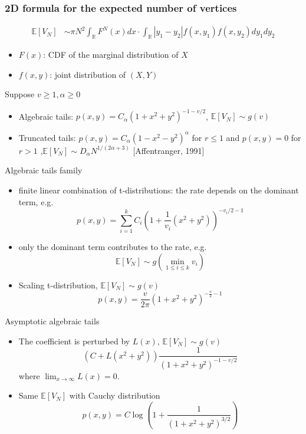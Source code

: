 \documentclass{beamer}
\def\E{\mathbb{E}}
\def\R{\mathbb{R}}
\begin{document}
\begin{frame}
    \frametitle{
        2D formula for the expected number of vertices
    }
    \begin{align*}
        \E[V_N]
        & \sim \pi N^2 \int_{\R} F^{N}(x) dx \cdot \int_{\R} |y_1-y_2| f(x, y_1) f(x,y_2)dy_1dy_2
    \end{align*}
    \begin{itemize}
        \item $F(x)$: CDF of the marginal distribution of $X$
        \item $f(x,y)$: joint distribution of $(X,Y)$
    \end{itemize}
    Suppose  $v\geq 1, \alpha \geq 0$
    \begin{itemize}
        \item Algebraic tails: $p(x,y) = C_{\alpha}(1+x^2+y^2)^{-1-v/2}$,
        $\E[V_N] \sim g(v)$
        \item Truncated tails: $p(x,y) = C_{\alpha}(1-x^2-y^2)^{\alpha}$ for $r\leq 1$ and $p(x,y)=0$ for $r>1$
        ,$\E[V_N] \sim D_{\alpha} N^{1/(2\alpha + 3)}$ [Affentranger, 1991]
    \end{itemize}
\end{frame}
\begin{frame}{Algebraic tails family}
    \begin{itemize}
        \item finite linear combination of t-distributions: the rate depends on the dominant term, e.g.
        \begin{equation*}
            p(x,y) = \sum_{i=1}^k C_i (1+\frac{1}{v_i}(x^2+y^2))^{-v_i/2 - 1}
        \end{equation*}
        \item only the dominant term contributes to the rate, e.g.
        \begin{equation*}
            \E[V_N] \sim g\left(
                \min_{1\leq i\leq k} v_i
                \right)
        \end{equation*}
        \item Scaling t-distribution, $\E[V_N] \sim g(v)$
        \begin{equation}
            p(x,y)= \frac{v}{2\pi}(1+x^2+y^2)^{-\frac{v}{2}-1}
        \end{equation}
    \end{itemize}
\end{frame}
\begin{frame}{Asymptotic algebraic tails}
    \begin{itemize}
        \item The coefficient is perturbed by $L(x)$, $\E[V_N] \sim g(v)$
        $$
        \left(C+L(x^2+y^2) \right)
        \frac{1}{(1+x^2+y^2)^{-1-v/2}}
        $$
        where $\lim_{x\to \infty} L(x) = 0$.
        \item  Same $\E[V_N]$ with Cauchy distribution
        \begin{equation*}
            p(x,y) = C \log \left(1+\frac{1}{(1+x^2+y^2)^{3/2}} \right)
        \end{equation*}
    \end{itemize}
\end{frame}
\end{document}
